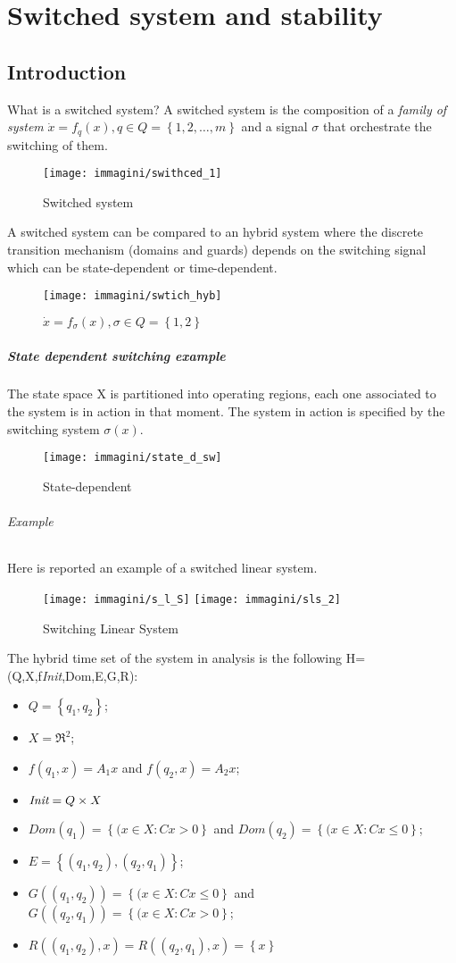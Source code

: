 \chapter{Switched system and stability}
\section{Introduction}
What is a switched system? A switched system is the composition of a \emph{family of system} $\dot{x}=f_q(x), q \in Q=\left\{1,2,\dots,m\right\}$ and a signal $\sigma$ that orchestrate the switching of them.\\
\begin{figure}[H]
	\centering
	\texttt{[image: immagini/swithced\_1]}
	\caption{Switched system}
	\label{fig:swithced1}
\end{figure}
A switched system can be compared to an hybrid system where the discrete transition mechanism (domains and guards) depends on the switching signal which can be state-dependent or time-dependent.
\begin{figure}[H]
	\centering
	\texttt{[image: immagini/swtich\_hyb]}
	\caption{$\dot{x}=f_{\sigma}(x), \sigma \in Q=\left\{1,2\right\}$}
	\label{fig:swtichhyb}
\end{figure}
\paragraph{State dependent switching example} The state space X is partitioned into operating regions, each one associated to the system is in action in that moment.  The system in action is specified by the switching system $\sigma(x)$.
\begin{figure}[H]
	\centering
	\texttt{[image: immagini/state\_d\_sw]}
	\caption{State-dependent}
	\label{fig:statedsw}
\end{figure}
\subparagraph{Example} Here is reported an example of a switched linear system.
\begin{figure}[H]
	\centering
	\texttt{[image: immagini/s\_l\_S]}
	\texttt{[image: immagini/sls\_2]}
	\caption{Switching Linear System}
	\label{fig:sls2}
\end{figure}
The hybrid time set of the system in analysis is the following H=(Q,X,f\textit{Init},Dom,E,G,R):
\begin{itemize}
	\item $Q=\left\{q_1,q_2\right\}$;
	\item $X=\Re^2$;
	\item $f(q_1,x)=A_1x$ and $f(q_2,x)=A_2x$; 
	\item $\emph{Init}=Q \times X$ 
	\item $Dom(q_1)=\left\{(x\in X\colon Cx>0\right\} $ and $Dom(q_2)=\left\{(x\in X\colon Cx\le0\right\} $;
	\item $E=\left\{(q_1,q_2),(q_2,q_1)\right\}$;
	\item$G((q_1,q_2))=\left\{(x\in X\colon Cx\le0\right\} $ and $G((q_2,q_1))=\left\{(x\in X\colon Cx>0\right\} $;
	\item$R((q_1,q_2),x)=R((q_2,q_1),x)=\left\{x \right\}$
\end{itemize}
